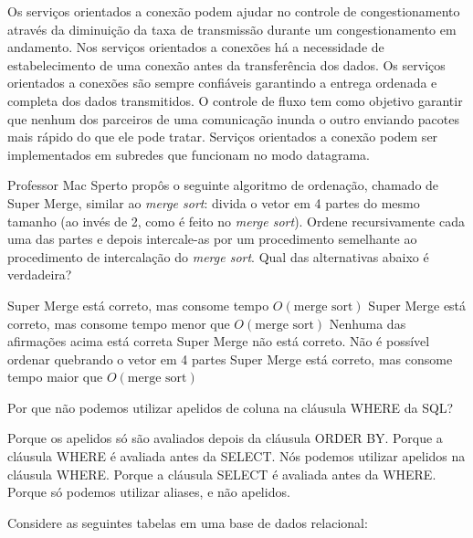 \documentclass[12pt, addpoints]{exam}
\begin{document}
\begin{questions}
\begin{choices}
\choice Os serviços orientados a conexão podem ajudar no controle de congestionamento através da diminuição da taxa de transmissão durante um congestionamento em andamento.
\choice Nos serviços orientados a conexões há a necessidade de estabelecimento de uma conexão antes da transferência dos dados.
\choice Os serviços orientados a conexões são sempre confiáveis garantindo a entrega ordenada e completa dos dados transmitidos.
\choice O controle de fluxo tem como objetivo garantir que nenhum dos parceiros de uma comunicação inunda o outro enviando pacotes mais rápido do que ele pode tratar.
\choice Serviços orientados a conexão podem ser implementados em subredes que funcionam no modo datagrama.
\end{choices}

\question

Professor Mac Sperto propôs o seguinte algoritmo de ordenação, chamado de Super Merge, similar ao \textit{merge sort}: divida o vetor em 4 partes do mesmo tamanho (ao invés de 2, como é feito no \textit{merge sort}). Ordene recursivamente cada uma das partes e depois intercale-as por um procedimento semelhante ao procedimento de intercalação do \textit{merge sort}. Qual das alternativas abaixo é verdadeira?
\begin{choices}
\choice Super Merge está correto, mas consome tempo \( O(\text{merge sort}) \)
\choice Super Merge está correto, mas consome tempo menor que \( O(\text{merge sort}) \)
\choice Nenhuma das afirmações acima está correta
\choice Super Merge não está correto. Não é possível ordenar quebrando o vetor em 4 partes
\choice Super Merge está correto, mas consome tempo maior que \( O(\text{merge sort}) \)
\end{choices}

\question

Por que não podemos utilizar apelidos de coluna na cláusula WHERE da SQL?
\begin{choices}
\choice Porque os apelidos só são avaliados depois da cláusula ORDER BY.
\choice Porque a cláusula WHERE é avaliada antes da SELECT.
\choice Nós podemos utilizar apelidos na cláusula WHERE.
\choice Porque a cláusula SELECT é avaliada antes da WHERE.
\choice Porque só podemos utilizar aliases, e não apelidos.
\end{choices}

\question

Considere as seguintes tabelas em uma base de dados relacional:\\


\end{questions}
\end{document}
